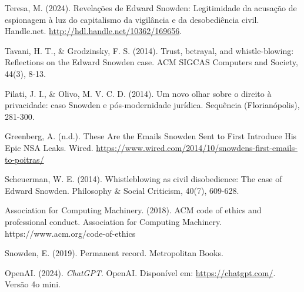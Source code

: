 \documentclass[a4paper,12pt]{article}
\begin{document}
\begin{thebibliography}{10}

    Teresa, M. (2024). Revelações de Edward Snowden: Legitimidade da acusação de espionagem à luz do capitalismo da vigilância e da desobediência civil. Handle.net. \url{http://hdl.handle.net/10362/169656}.


        Tavani, H. T., \& Grodzinsky, F. S. (2014). Trust, betrayal, and whistle-blowing: Reflections on the Edward Snowden case. ACM SIGCAS Computers and Society, 44(3), 8-13.
    
    Pilati, J. I., \& Olivo, M. V. C. D. (2014). Um novo olhar sobre o direito à privacidade: caso Snowden e pós-modernidade jurídica. Sequência (Florianópolis), 281-300.
    
    Greenberg, A. (n.d.). These Are the Emails Snowden Sent to First Introduce His Epic NSA Leaks. Wired. \url{https://www.wired.com/2014/10/snowdens-first-emails-to-poitras/}

    Scheuerman, W. E. (2014). Whistleblowing as civil disobedience: The case of Edward Snowden. Philosophy \& Social Criticism, 40(7), 609-628.
    
    Association for Computing Machinery. (2018). ACM code of ethics and professional conduct. Association for Computing Machinery. https://www.acm.org/code-of-ethics
    
    Snowden, E. (2019). Permanent record. Metropolitan Books.

        OpenAI. (2024). \textit{ChatGPT}. OpenAI. Disponível em: \url{https://chatgpt.com/}. Versão 4o mini.
    
   
\end{thebibliography}

\printglossaries
\end{document}
